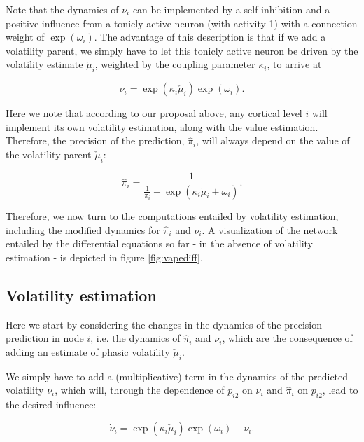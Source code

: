 
Note that the dynamics of $\nu_i$ can be implemented by a self-inhibition and a positive influence from a tonicly active neuron (with activity 1) with a connection weight of $\exp(\omega_i)$. The advantage of this description is that if we add a volatility parent, we simply have to let this tonicly active neuron be driven by the volatility estimate $\check{\mu}_i$, weighted by the coupling parameter $\kappa_i$, to arrive at 

\begin{equation}
	\nu_i = \exp(\kappa_i \check{\mu}_i) \exp(\omega_i).
\end{equation}

Here we note that according to our proposal above, any cortical level $i$ will implement its own volatility estimation, along with the value estimation. Therefore, the precision of the prediction, $\hat{\pi}_i$, will always depend on the value of the volatility parent $\check{\mu}_i$:

\begin{equation}
	\hat{\pi}_i = \frac{1}{\frac{1}{\pi_i} + \exp(\kappa_i \check{\mu}_i + \omega_i)}.
\end{equation}

Therefore, we now turn to the computations entailed by volatility estimation, including the modified dynamics for $\hat{\pi}_i$ and $\nu_i$. A visualization of the network entailed by the differential equations so far - in the absence of volatility estimation - is depicted in figure \ref{fig:vapediff}.

\subsection{Volatility estimation}

Here we start by considering the changes in the dynamics of the precision prediction in node $i$, i.e. the dynamics of $\hat{\pi}_i$ and $\nu_i$, which are the consequence of adding an estimate of phasic volatility $\check{\mu}_i$.

We simply have to add a (multiplicative) term in the dynamics of the predicted volatility $\nu_i$, which will, through the dependence of $p_{i2}$ on $\nu_i$ and $\hat{\pi}_i$ on $p_{i2}$, lead to the desired influence:

\begin{equation}
	\dot{\nu}_i = \exp(\kappa_i \check{\mu}_i) \exp(\omega_i) - \nu_i.
\end{equation}

